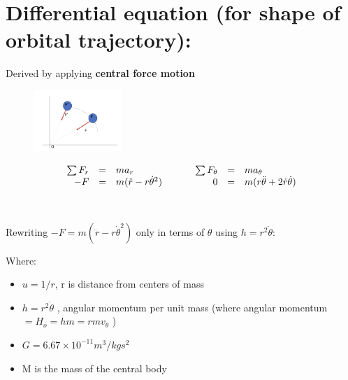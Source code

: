 \documentclass[10pt, fleqn]{article}
\begin{document}
\section*{Differential equation (for shape of orbital trajectory):}
Derived by applying \textbf{central force motion} 
\begin{figure}[H]
    \centering
    \includegraphics[width=0.3\textwidth]{central force.png}    
\end{figure}
\noindent
\[\begin{array}{rcl@{\hskip 1.2cm}rcl}
\sum F_r &=& ma_r & \sum F_\theta &=& ma_\theta \\
-F &=& m(\ddot{r} - r\dot{\theta}^2) & 0 &=& m(r\ddot{\theta} + 2\dot{r}\dot{\theta})
\end{array}\]\\\\
Rewriting $-F = m(\ddot{r} - r\dot{\theta}^2)$ only in terms of $\theta$ using $h=r^2\dot{\theta}$:
\begin{center}
\end{center}
Where:
\begin{itemize}
    \item $u=1/r$, r is distance from centers of mass 
    \item $h=r^2\dot{\theta}$ , angular momentum per unit mass (where angular momentum $=H_o=hm=rmv_\theta$ )
    \item $G=6.67\times10^{-11} m^3/kgs^2$
    \item M is the mass of the central body
\end{itemize}
\end{document}
